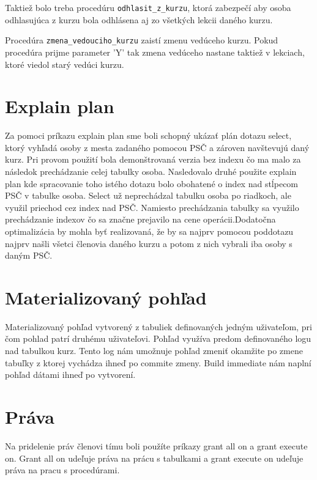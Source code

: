 \documentclass[11pt]{article}
\begin{document}
Taktiež bolo treba procedúru \texttt{odhlasit\_z\_kurzu}, ktorá zabezpečí 
aby osoba odhlasujúca z kurzu bola odhlásena aj zo všetkých lekcii daného kurzu. 

Procedúra \texttt{zmena\_vedouciho\_kurzu} zaistí zmenu vedúceho kurzu. Pokud procedúra prijme parameter 'Y'
tak zmena vedúceho nastane taktiež v lekciach, ktoré viedol starý vedúci kurzu.

\section{Explain plan}
Za pomoci príkazu explain plan sme boli schopný ukázať plán dotazu select, ktorý vyhľadá osoby z mesta zadaného pomocou PSČ
a zároven navštevujú daný kurz. Pri provom použití bola demonštrovaná verzia bez indexu čo ma malo za následok prechádzanie
celej tabulky osoba. Nasledovalo druhé použite explain plan kde spracovanie toho istého dotazu bolo obohatené o index nad
stĺpecom PSČ v tabulke osoba. Select už neprechádzal tabulku osoba po riadkoch, ale využil priechod cez index nad PSČ.
Namiesto prechádzania tabulky sa využilo prechádzanie indexov čo sa značne prejavilo na cene operácii.Dodatočna optimalizácia 
by mohla byť realizovaná, že by sa najprv pomocou poddotazu najprv našli všetci členovia daného kurzu a potom z nich vybrali 
iba osoby s daným PSČ.

\section{Materializovaný pohľad}
Materializovaný pohľad vytvorený z tabuliek definovaných jedným uživateľom, pri čom pohlad patrí druhému uživateľovi.
Pohľad využíva predom definovaného logu nad tabulkou kurz. Tento log nám umožnuje pohľad zmeniť okamžite po zmene tabuľky
z ktorej vychádza ihneď po commite zmeny. Build immediate nám naplní pohľad dátami ihneď po vytvorení.


\section{Práva}
Na pridelenie práv členovi tímu boli použíte príkazy grant all on a grant execute on.
Grant all on udeľuje práva na prácu s tabulkami a grant execute on udeľuje práva na pracu s procedúrami.
\end{document}
